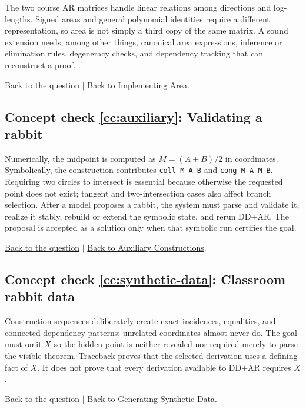 \documentclass[reqno]{amsart}
\DeclareMathOperator{\1}{\textbf{1}}
\begin{document}
The two course AR matrices handle linear relations among directions and
log-lengths. Signed areas and general polynomial identities require a
different representation, so area is not simply a third copy of the same
matrix. A sound extension needs, among other things, canonical area
expressions, inference or elimination rules, degeneracy checks, and dependency
tracking that can reconstruct a proof.

\noindent\hyperlink{ccq:area-extension}{Back to the question}
$\mid$
\hyperref[sec: Implementing Area]{Back to Implementing Area}.

\hypertarget{cca:auxiliary}{}
\subsection*{Concept check \ref{cc:auxiliary}: Validating a rabbit}

Numerically, the midpoint is computed as
$M=(A+B)/2$ in coordinates. Symbolically, the construction contributes
\verb|coll M A B| and \verb|cong M A M B|. Requiring two circles to intersect
is essential because otherwise the requested point does not exist; tangent
and two-intersection cases also affect branch selection. After a model proposes
a rabbit, the system must parse and validate it, realize it stably, rebuild or
extend the symbolic state, and rerun DD+AR. The proposal is accepted as a
solution only when that symbolic run certifies the goal.

\noindent\hyperlink{ccq:auxiliary}{Back to the question}
$\mid$
\hyperref[sec: Auxiliary Constructions]{Back to Auxiliary Constructions}.

\hypertarget{cca:synthetic-data}{}
\subsection*{Concept check \ref{cc:synthetic-data}: Classroom rabbit data}

Construction sequences deliberately create exact incidences, equalities, and
connected dependency patterns; unrelated coordinates almost never do. The
goal must omit $X$ so the hidden point is neither revealed nor required merely
to parse the visible theorem. Traceback proves that the selected derivation
uses a defining fact of $X$. It does not prove that every derivation available
to DD+AR requires $X$.

\noindent\hyperlink{ccq:synthetic-data}{Back to the question}
$\mid$
\hyperref[sec: Generating Synthetic Data]{Back to Generating Synthetic Data}.
\end{document}
